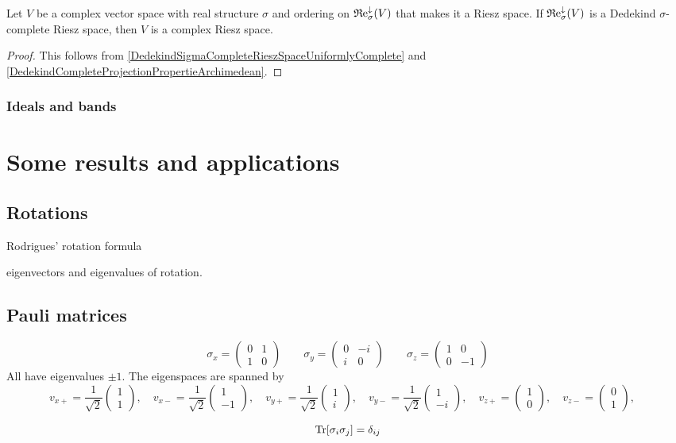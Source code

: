 \begin{corollary}
Let $V$ be a complex vector space with real structure $\sigma$ and ordering on $\operatorname{\mathfrak{R}e}^\downarrow_\sigma(V)$ that makes it a Riesz space. If $\operatorname{\mathfrak{R}e}^\downarrow_\sigma(V)$ is a Dedekind $\sigma$-complete Riesz space, then $V$ is a complex Riesz space.
\end{corollary}
\begin{proof}
This follows from \ref{DedekindSigmaCompleteRieszSpaceUniformlyComplete} and \ref{DedekindCompleteProjectionPropertieArchimedean}.
\end{proof}

\subsection{Ideals and bands}


\chapter{Some results and applications}
\section{Rotations}
Rodrigues' rotation formula

eigenvectors and eigenvalues of rotation.
\section{Pauli matrices}

\[ \sigma_x = \begin{pmatrix}
0 & 1 \\ 1 & 0
\end{pmatrix} \qquad \sigma_y = \begin{pmatrix}
0 & -i \\ i & 0
\end{pmatrix} \qquad \sigma_z = \begin{pmatrix}
1 & 0 \\ 0 & -1
\end{pmatrix} \]
All have eigenvalues $\pm 1$. The eigenspaces are spanned by
\[ v_{x+} = \frac{1}{\sqrt{2}}\begin{pmatrix}
1 \\ 1
\end{pmatrix}, \quad v_{x-} = \frac{1}{\sqrt{2}}\begin{pmatrix}
1 \\ -1
\end{pmatrix}, \quad v_{y+} = \frac{1}{\sqrt{2}}\begin{pmatrix}
1 \\ i
\end{pmatrix}, \quad v_{y-} = \frac{1}{\sqrt{2}}\begin{pmatrix}
1 \\ -i
\end{pmatrix}, \quad v_{z+} = \begin{pmatrix}
1 \\ 0
\end{pmatrix}, \quad v_{z-} = \begin{pmatrix}
0 \\ 1
\end{pmatrix}, \quad  \]

\[ \operatorname{Tr}[\sigma_i \sigma_j] = \delta_{ij} \]

